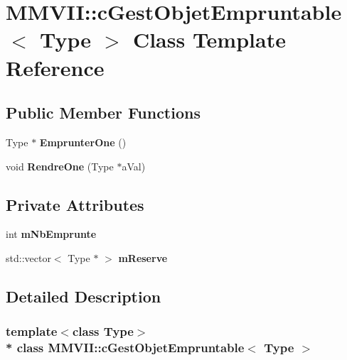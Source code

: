 \hypertarget{classMMVII_1_1cGestObjetEmpruntable}{}\section{M\+M\+V\+II\+:\+:c\+Gest\+Objet\+Empruntable$<$ Type $>$ Class Template Reference}
\label{classMMVII_1_1cGestObjetEmpruntable}
\subsection*{Public Member Functions}
\begin{DoxyCompactItemize}
\item 
Type $\ast$ {\bfseries Emprunter\+One} ()\hypertarget{classMMVII_1_1cGestObjetEmpruntable_a866677059e37e667f77f98dbb801010c}{}\label{classMMVII_1_1cGestObjetEmpruntable_a866677059e37e667f77f98dbb801010c}

\item 
void {\bfseries Rendre\+One} (Type $\ast$a\+Val)\hypertarget{classMMVII_1_1cGestObjetEmpruntable_ad3527c48f4ab808a12b6fd82a19b3009}{}\label{classMMVII_1_1cGestObjetEmpruntable_ad3527c48f4ab808a12b6fd82a19b3009}

\end{DoxyCompactItemize}
\subsection*{Private Attributes}
\begin{DoxyCompactItemize}
\item 
int {\bfseries m\+Nb\+Emprunte}\hypertarget{classMMVII_1_1cGestObjetEmpruntable_aaca7eb56dcf556f1432cade1814f98ce}{}\label{classMMVII_1_1cGestObjetEmpruntable_aaca7eb56dcf556f1432cade1814f98ce}

\item 
std\+::vector$<$ Type $\ast$ $>$ {\bfseries m\+Reserve}\hypertarget{classMMVII_1_1cGestObjetEmpruntable_a1f024fe5e2c5cb2358b7f919bbf084f1}{}\label{classMMVII_1_1cGestObjetEmpruntable_a1f024fe5e2c5cb2358b7f919bbf084f1}

\end{DoxyCompactItemize}


\subsection{Detailed Description}
\subsubsection*{template$<$class Type$>$\\*
class M\+M\+V\+I\+I\+::c\+Gest\+Objet\+Empruntable$<$ Type $>$}



